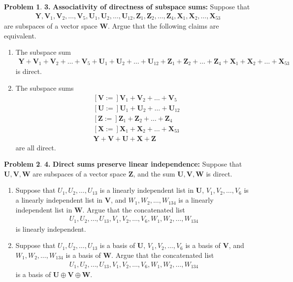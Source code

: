 \documentclass{article}
\theoremstyle{definition}
\newtheorem*{prob*}{Problem}
\newcommand{\V}{\mathbf{V}}
\newcommand{\W}{\mathbf{W}}
\newcommand{\Z}{\mathbf{Z}}
\newcommand{\Y}{\mathbf{Y}}
\newcommand{\U}{\mathbf{U}}
\newcommand{\X}{\mathbf{X}}
\begin{document}
\begin{prob*} \textbf{3.} \textbf{Associativity of directness of subspace sums:} Suppose that 
	\begin{align*}
	\Y, \V_1, \V_2, \dots, \V_5, \U_1, \U_2, \dots, \U_{12},\Z_1,\Z_2,\dots,\Z_4, \X_1, \X_2, \dots,\X_{53}
	\end{align*}
	are subspaces of a vector space $\W$. Argue that the following claims are equivalent. 
	\begin{enumerate}
		\item The subspace sum 
		\begin{align*}
		\Y+ \V_1+ \V_2+\dots+ \V_5+ \U_1+ \U_2+ \dots+ \U_{12}+\Z_1+\Z_2+\dots+\Z_4+ \X_1+ \X_2+ \dots+\X_{53}
		\end{align*}
		is direct. 
		\item The subspace sums
		\begin{align*}
		&\left[\V :=  \right] \V_1 +\V_2 + \dots + \V_5\\
		&\left[\U :=  \right] \U_1 +\U_2 + \dots + \U_{12}\\
		&\left[\Z :=  \right] \Z_1 +\Z_2 + \dots + \Z_4\\
		&\left[\X :=  \right] \X_1 +\X_2 + \dots + \X_{53}\\
		&\Y + \V + \U + \X + \Z
		\end{align*}
		are all direct. 
	\end{enumerate}

\end{prob*}


\newpage

\begin{prob*} \textbf{4.} \textbf{Direct sums preserve linear independence:} Suppose that $\U,\V,\W$ are subspaces of a vector space $\Z$, and the sum $\U,\V,\W$ is direct. 
	\begin{enumerate}
		\item Suppose that $U_1,U_2,\dots,U_{13}$ is a linearly independent list in $\U$, $V_1,V_2,\dots,V_{6}$ is a linearly independent list in $\V$, and $W_1,W_2,\dots,W_{134}$ is a linearly independent list in $\W$. Argue that the concatenated list 
		\begin{align*}
		U_1,U_2,\dots,U_{13},V_1,V_2,\dots,V_{6},W_1,W_2,\dots,W_{134}
		\end{align*}
		is linearly independent. 
		\item Suppose that $U_1,U_2,\dots,U_{13}$ is a basis of $\U$, $V_1,V_2,\dots,V_{6}$ is a basis of $\V$, and $W_1,W_2,\dots,W_{134}$ is a basis of $\W$. Argue that the concatenated list
		\begin{align*}
		U_1,U_2,\dots,U_{13},V_1,V_2,\dots,V_{6},W_1,W_2,\dots,W_{134}
		\end{align*}
		is a basis of $\U \oplus \V \oplus \W$.
	\end{enumerate}

\end{prob*}
\end{document}
